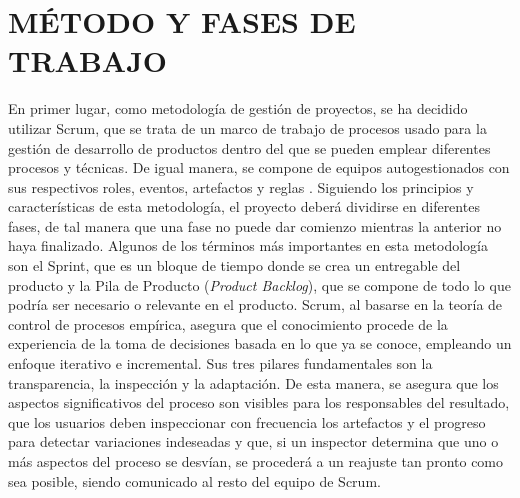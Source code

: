 \documentclass{pre-tfg}
\begin{document}
\clearpage

\section{MÉTODO Y FASES DE TRABAJO}
%
%
%

En primer lugar, como metodología de gestión de proyectos, se ha decidido utilizar Scrum, que se trata de un marco de trabajo de procesos usado para la gestión de desarrollo de productos dentro del que se pueden emplear diferentes procesos y técnicas. De igual manera, se compone de equipos autogestionados con sus respectivos roles, eventos, artefactos y reglas \cite{Schwaber2017}. Siguiendo los principios y características de esta metodología, el proyecto deberá dividirse en diferentes fases, de tal manera que una fase no puede dar comienzo mientras la anterior no haya finalizado. Algunos de los términos más importantes en esta metodología son el Sprint, que es un bloque de tiempo donde se crea un entregable del producto y la Pila de Producto (\textit{Product Backlog}), que se compone de todo lo que podría ser necesario o relevante en el producto. Scrum, al basarse en la teoría de control de procesos empírica, asegura que el conocimiento procede de la experiencia de la toma de decisiones basada en lo que ya se conoce, empleando un enfoque iterativo e incremental. Sus tres pilares fundamentales son la transparencia, la inspección y la adaptación. De esta manera, se asegura que los aspectos significativos del proceso son visibles para los responsables del resultado, que los usuarios deben inspeccionar con frecuencia los artefactos y el progreso para detectar variaciones indeseadas y que, si un inspector determina que uno o más aspectos del proceso se desvían, se procederá a un reajuste tan pronto como sea posible, siendo comunicado al resto del equipo de Scrum.
\end{document}
